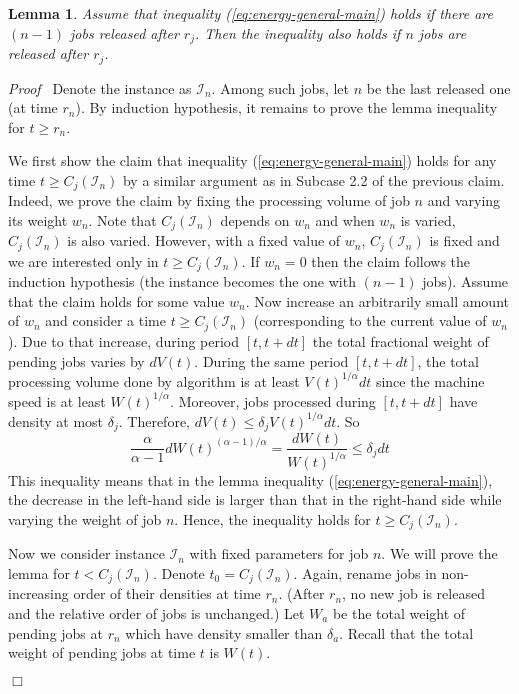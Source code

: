 \documentclass[11pt]{article}
\newenvironment{proof}{\noindent\emph{Proof\ }}{\hspace*{\fill}$\Box$\medskip}
\newtheorem{lemma}{Lemma}
\begin{document}
\begin{lemma}		\label{lem:induction}
Assume that inequality (\ref{eq:energy-general-main}) holds if 
there are $(n-1)$ jobs released after $r_{j}$. Then the inequality also holds
if $n$ jobs are released after $r_{j}$.
\end{lemma}
\begin{proof}
Denote the instance as $\mathcal{I}_{n}$.
Among such jobs, let $n$ be the last released one (at time $r_{n}$).
By induction hypothesis, it remains to prove the lemma inequality for $t \geq r_{n}$.

We first show the claim that inequality (\ref{eq:energy-general-main}) holds for any time 
$t \geq C_{j}(\mathcal{I}_{n})$ by a similar argument as in Subcase 2.2 of the previous claim. 
Indeed, we prove the claim by fixing the 
processing volume of job $n$ and varying its weight $w_{n}$. Note that 
$C_{j}(\mathcal{I}_{n})$ depends on $w_{n}$ and when $w_{n}$ is varied, 
$C_{j}(\mathcal{I}_{n})$ is also varied. However, with a fixed value of 
$w_{n}$, $C_{j}(\mathcal{I}_{n})$ is fixed and 
we are interested only in $t \geq C_{j}(\mathcal{I}_{n})$. If $w_{n} = 0$ then 
the claim follows the induction hypothesis (the instance becomes the one 
with $(n-1)$ jobs).  Assume that the claim holds for some value $w_{n}$.
Now increase an arbitrarily small amount of $w_{n}$ and 
consider a time $t \geq C_{j}(\mathcal{I}_{n})$ (corresponding to the current value of $w_{n}$).
Due to that increase, during period $[t,t+dt]$ the total fractional weight of pending jobs 
varies by $dV(t)$. During the same period $[t,t+dt]$,
the total processing volume done by algorithm is at least
$V(t)^{1/\alpha}dt$ since the machine speed is at least $W(t)^{1/\alpha}$.
Moreover, jobs processed during $[t,t+dt]$ have density at most $\delta_{j}$.
Therefore, $dV(t) \leq  \delta_{j} V(t)^{1/\alpha}dt$.    
So 
$$
\frac{\alpha}{\alpha-1}dW(t)^{(\alpha-1)/\alpha} 
	= \frac{dW(t)}{ W(t)^{1/\alpha}} \leq \delta_{j}dt
$$
This inequality means that in the lemma inequality (\ref{eq:energy-general-main}), 
the decrease in the left-hand side 
is larger than that in the right-hand side while varying the weight of job $n$. 
Hence, the inequality holds for $t \geq C_{j}(\mathcal{I}_{n})$.



Now we consider instance $\mathcal{I}_{n}$ with fixed parameters for job $n$.
We will prove the lemma for $t < C_{j}(\mathcal{I}_{n})$.
Denote $t_{0} = C_{j}(\mathcal{I}_{n})$. Again, rename jobs 
in non-increasing order of their  densities at time $r_{n}$.
(After $r_{n}$, no new job is released and the relative order of jobs is unchanged.)
Let $W_{a}$ be the total weight of pending jobs at $r_{n}$
which have  density smaller than $\delta_{a}$. 
Recall that the total weight of pending jobs at time $t$ is $W(t)$.


\end{proof}
\end{document}
